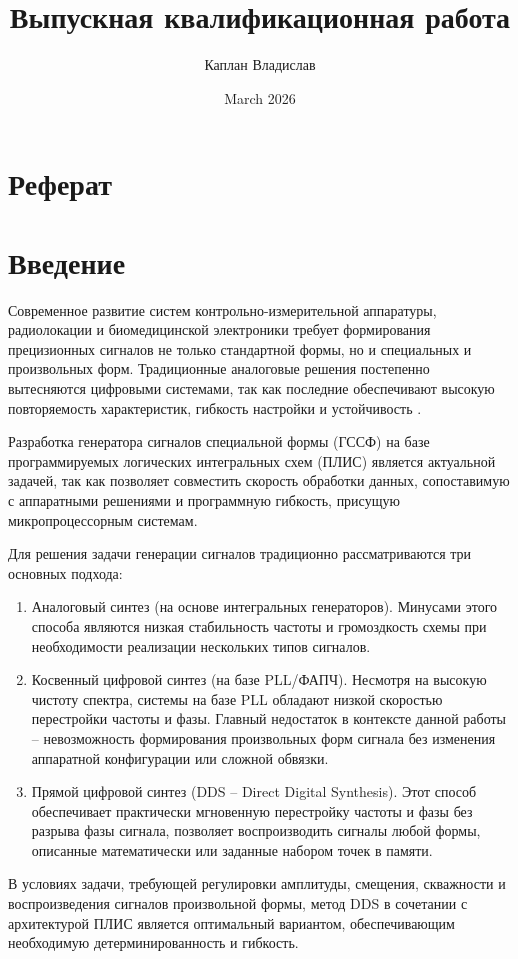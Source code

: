 \documentclass[12pt,a4paper,TimesNewRoman]{article}
\title{Выпускная квалификационная работа}
\author{Каплан Владислав}
\date{March 2026}
\begin{document}
\newpage
\section*{Реферат}


\thispagestyle{empty}
\tableofcontents
\newpage

\section*{Введение}
Современное развитие систем контрольно-измерительной аппаратуры, радиолокации и биомедицинской электроники требует формирования прецизионных сигналов не только стандартной формы, но и специальных и произвольных форм. Традиционные аналоговые решения постепенно вытесняются цифровыми системами, так как последние обеспечивают высокую повторяемость характеристик, гибкость настройки и устойчивость \cite{Hao_2021}.

Разработка генератора сигналов специальной формы (ГССФ) на базе программируемых логических интегральных схем (ПЛИС) является актуальной задачей, так как позволяет совместить скорость обработки данных, сопоставимую с аппаратными решениями и программную гибкость, присущую микропроцессорным системам.

Для решения задачи генерации сигналов традиционно рассматриваются три основных подхода:
\begin{enumerate}
    \item Аналоговый синтез (на основе интегральных генераторов). Минусами этого способа являются низкая стабильность частоты и громоздкость схемы при необходимости реализации нескольких типов сигналов.
    \item Косвенный цифровой синтез (на базе PLL/ФАПЧ). Несмотря на высокую чистоту спектра, системы на базе PLL обладают низкой скоростью перестройки частоты и фазы. Главный недостаток в контексте данной работы -- невозможность формирования произвольных форм сигнала без изменения аппаратной конфигурации или сложной обвязки.
    \item Прямой цифровой синтез (DDS -- Direct Digital Synthesis). Этот способ обеспечивает практически мгновенную перестройку частоты и фазы без разрыва фазы сигнала, позволяет воспроизводить сигналы любой формы, описанные математически или заданные набором точек в памяти.
\end{enumerate}
В условиях задачи, требующей регулировки амплитуды, смещения, скважности и воспроизведения сигналов произвольной формы, метод DDS в сочетании с архитектурой ПЛИС является оптимальный вариантом, обеспечивающим необходимую детерминированность и гибкость.
\end{document}
